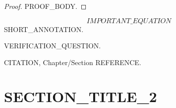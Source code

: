 \begin{proof}
PROOF_BODY.
\end{proof}

\begin{keyeqn}
\begin{equation}
  IMPORTANT\_EQUATION
  \label{eq:LABEL}
\end{equation}
SHORT_ANNOTATION.
\end{keyeqn}

\begin{checkpoint}
VERIFICATION\_QUESTION.
\end{checkpoint}



\begin{refnote}
CITATION, Chapter/Section REFERENCE.
\end{refnote}

\section{SECTION\_TITLE\_2}
\label{sec:LABEL_sec2}



